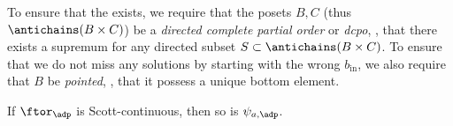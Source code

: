 



To ensure that the  exists, we require that the posets $B, C$ (thus $\antichains (B \times C)$) be a \emph{directed complete partial order} or \emph{dcpo}, \ie,  that there exists a supremum for any directed subset $S \subset \antichains (B \times C)$.
To ensure that we do not miss any solutions by starting with the wrong $b_{\text{in}}$, we also require that $B$ be \emph{pointed}, \ie,  that it possess a unique bottom element.


\begin{lemma}
    If $\ftor_\adp$ is Scott-continuous, then so is $\psi_{a,\adp}$.
\end{lemma}


